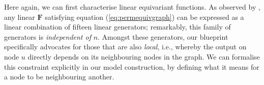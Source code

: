 %
%


Here again, we can first characterise linear equivariant functions.  
As observed by \cite{maron2018invariant}, any linear $\mathbf{F}$ satisfying equation (\ref{eq:permequivgraph}) can be expressed as a linear combination 
of fifteen linear generators; remarkably, this family of generators is {\em independent of} $n$. 
%
%
%
Amongst these generators, our blueprint specifically advocates for those that are also {\em local}, i.e., whereby  
the output on node $u$ directly depends on its neighbouring nodes in the graph. We can formalise this constraint explicitly in our model construction, by defining what it means for a node to be neighbouring another.



